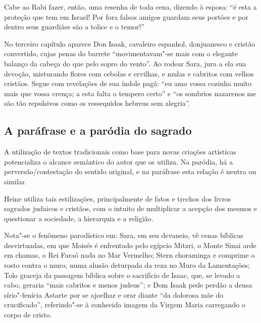 \documentclass[12pt]{extarticle}
\begin{document}


Cabe ao Rabi fazer, então, uma resenha de toda cena, dizendo à esposa:
``é esta a proteção que tem em Israel! Por fora falsos amigos guardam
seus portões e por dentro seus guardiães são a tolice e o temor!''

No terceiro capítulo aparece Don Isaak, cavaleiro espanhol, donjuanesco
e cristão convertido, cujas penas do barrete ``movimentavam"-se mais com
o elegante balanço da cabeça do que pelo sopro do vento''. Ao rodear
Sara, jura a ela sua devoção, misturando flores com cebolas e ervilhas,
e mulas e cabritos com velhos cristãos. Segue com revelações de sua
índole pagã: ``eu amo vossa cozinha muito mais que vossa crença; a esta
falta o tempero certo'' e ``os sombrios nazarenos me são tão repulsivos
como os ressequidos hebreus sem alegria''.








\subsection{A paráfrase e a paródia do sagrado}

A utilização de textos tradicionais como base para novas criações
artísticas potencializa o alcance semântico do autor que os utiliza. Na
paródia, há a perversão/contestação do sentido original, e na paráfrase
esta relação é neutra ou similar.

Heine utiliza tais estilizações, principalmente de fatos e trechos dos
livros sagrados judaicos e cristãos, com o intuito de multiplicar a
acepção dos mesmos e questionar a sociedade, a hierarquia e a religião.

Nota"-se o fenômeno parodístico em: Sara, em seu devaneio, vê cenas
bíblicas desvirtuadas, em que Moisés é enfrentado pelo egípcio Mitzri, o
Monte Sinai arde em chamas, o Rei Faraó nada no Mar Vermelho; Stern
choraminga e comprime o rosto contra o muro, numa alusão deturpada da
reza no Muro da Lamentações; Tolo graceja da passagem bíblica sobre o
sacrifício de Isaac, que, se levado a cabo, geraria ``mais cabritos e
menos judeus''; e Dom Isaak pede perdão a deusa sírio"-fenícia Astarte
por se ajoelhar e orar diante ``da dolorosa mãe do crucificado'',
referindo"-se à conhecida imagem da Virgem Maria carregando o corpo de
cristo.
\end{document}
